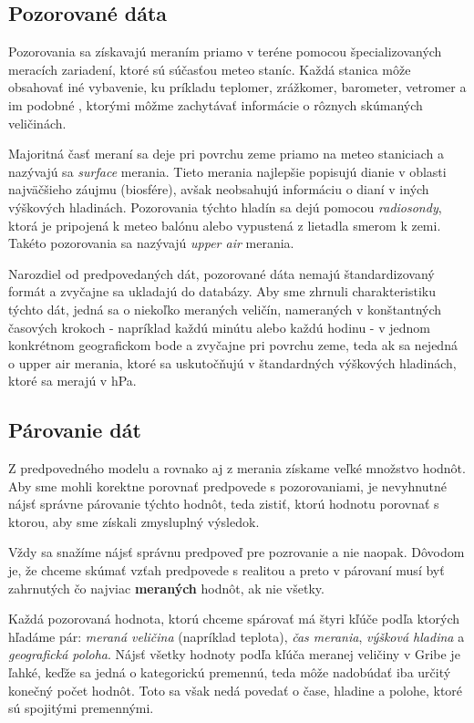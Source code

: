 \subsection{Pozorované dáta}
Pozorovania sa získavajú meraním priamo v teréne pomocou špecializovaných meracích zariadení, ktoré sú súčasťou meteo staníc. Každá stanica môže obsahovať iné vybavenie, ku príkladu teplomer, zrážkomer, barometer, vetromer a im podobné \cite{WeatherStation}, ktorými môžme zachytávať informácie o rôznych skúmaných veličinách. 

Majoritná časť meraní sa deje pri povrchu zeme priamo na meteo staniciach a nazývajú sa \textit{surface} merania. Tieto merania najlepšie popisujú dianie v oblasti najväčšieho záujmu (biosfére), avšak neobsahujú informáciu o dianí v iných výškových hladinách. Pozorovania týchto hladín sa dejú pomocou \textit{radiosondy}, ktorá je pripojená k meteo balónu alebo vypustená z lietadla smerom k zemi. Takéto pozorovania sa nazývajú \textit{upper air} merania.

Narozdiel od predpovedaných dát, pozorované dáta nemajú štandardizovaný formát a zvyčajne sa ukladajú do databázy.
Aby sme zhrnuli charakteristiku týchto dát, jedná sa o niekoľko meraných veličín, nameraných v konštantných časových krokoch - napríklad každú minútu alebo každú hodinu - v jednom konkrétnom geografickom bode a zvyčajne pri povrchu zeme, teda ak sa nejedná o upper air merania, ktoré sa uskutočňujú v štandardných výškových hladinách, ktoré sa merajú v hPa.

\subsection{Párovanie dát}
Z predpovedného modelu a rovnako aj z merania získame veľké množstvo hodnôt. Aby sme mohli korektne porovnať predpovede s pozorovaniami, je nevyhnutné nájsť správne párovanie týchto hodnôt, teda zistiť, ktorú hodnotu porovnať s ktorou, aby sme získali zmysluplný výsledok.

Vždy sa snažíme nájsť správnu predpoveď pre pozrovanie a nie naopak.
Dôvodom je, že chceme skúmať vzťah predpovede s realitou a preto v párovaní musí byť zahrnutých čo najviac \textbf{meraných} hodnôt, ak nie všetky.

Každá pozorovaná hodnota, ktorú chceme spárovať má štyri kľúče podľa ktorých hľadáme pár: \textit{meraná veličina} (napríklad teplota), \textit{čas merania}, \textit{výšková hladina} a \textit{geografická poloha}.
Nájsť všetky hodnoty podľa kľúča meranej veličiny v Gribe je ľahké, keďže sa jedná o kategorickú premennú, teda môže nadobúdať iba určitý konečný počet hodnôt. Toto sa však nedá povedať o čase, hladine a polohe, ktoré sú spojitými premennými.
 
